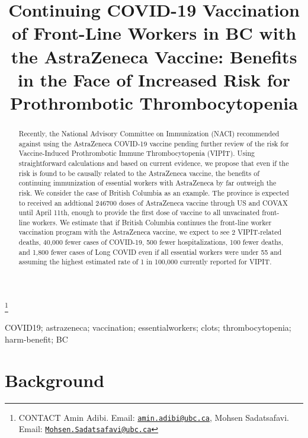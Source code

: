\documentclass[]{interact}
\theoremstyle{plain}%
\theoremstyle{definition}
\theoremstyle{remark}
\begin{document}

\title{Continuing COVID-19 Vaccination of Front-Line Workers in BC with
the AstraZeneca Vaccine: Benefits in the Face of Increased Risk for
Prothrombotic Thrombocytopenia}


\author{
}

\thanks{CONTACT Amin
Adibi. Email: \href{mailto:amin.adibi@ubc.ca}{\nolinkurl{amin.adibi@ubc.ca}}, Mohsen
Sadatsafavi. Email: \href{mailto:Mohsen.Sadatsafavi@ubc.ca}{\nolinkurl{Mohsen.Sadatsafavi@ubc.ca}}}

\maketitle

\begin{abstract}
Recently, the National Advisory Committee on Immunization (NACI)
recommended against using the AstraZeneca COVID-19 vaccine pending
further review of the risk for Vaccine-Induced Prothrombotic Immune
Thrombocytopenia (VIPIT). Using straightforward calculations and based
on current evidence, we propose that even if the risk is found to be
causally related to the AstraZeneca vaccine, the benefits of continuing
immunization of essential workers with AstraZeneca by far outweigh the
risk. We consider the case of British Columbia as an example. The
province is expected to received an addtional 246700 doses of
AstraZeneca vaccine through US and COVAX until April 11th, enough to
provide the first dose of vaccine to all unvacinated front-line workers.
We estimate that if British Columbia continues the front-line worker
vaccination program with the AstraZeneca vaccine, we expect to see 2
VIPIT-related deaths, 40,000 fewer cases of COVID-19, 500 fewer
hospitalizations, 100 fewer deaths, and 1,800 fewer cases of Long COVID
even if all essential workers were under 55 and assuming the highest
estimated rate of 1 in 100,000 currently reported for VIPIT.
\end{abstract}

\begin{keywords}
COVID19; astrazeneca; vaccination; essentialworkers; clots;
thrombocytopenia; harm-benefit; BC
\end{keywords}

\hypertarget{background}{%
\section{Background}\label{background}}
\end{document}
